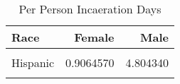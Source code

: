 \begin{table}[H]

\caption{\label{tab:tab:summarystats}Per Person Incaeration Days}
\centering
\begin{tabular}[t]{lrr}
\toprule
Race & Female & Male\\
\midrule
\cellcolor{gray!6}{Black} & \cellcolor{gray!6}{0.6426056} & \cellcolor{gray!6}{14.833333}\\
Hispanic & 0.9064570 & 4.804340\\
\cellcolor{gray!6}{Non-Black / Non-Hispanic} & \cellcolor{gray!6}{0.5876265} & \cellcolor{gray!6}{3.344241}\\
\bottomrule
\end{tabular}
\end{table}
